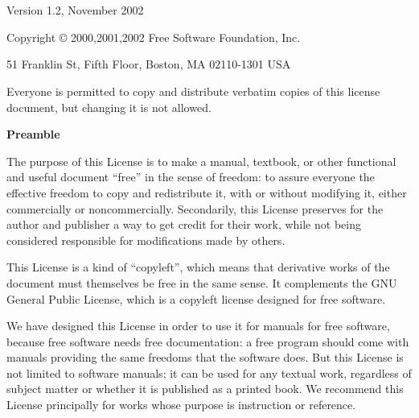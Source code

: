 %
%
%
%
%           
%
\chapter*{}

\begin{center}
Version 1.2, November 2002

 Copyright \copyright{} 2000,2001,2002  Free Software Foundation, Inc.
 
 \bigskip
 
     51 Franklin St, Fifth Floor, Boston, MA  02110-1301  USA
  
 \bigskip
 
 Everyone is permitted to copy and distribute verbatim copies
 of this license document, but changing it is not allowed.
\end{center}


\begin{center}
{\bf\large Preamble}
\end{center}

The purpose of this License is to make a manual, textbook, or other
functional and useful document ``free'' in the sense of freedom: to
assure everyone the effective freedom to copy and redistribute it,
with or without modifying it, either commercially or noncommercially.
Secondarily, this License preserves for the author and publisher a way
to get credit for their work, while not being considered responsible
for modifications made by others.

This License is a kind of ``copyleft'', which means that derivative
works of the document must themselves be free in the same sense.  It
complements the GNU General Public License, which is a copyleft
license designed for free software.

We have designed this License in order to use it for manuals for free
software, because free software needs free documentation: a free
program should come with manuals providing the same freedoms that the
software does.  But this License is not limited to software manuals;
it can be used for any textual work, regardless of subject matter or
whether it is published as a printed book.  We recommend this License
principally for works whose purpose is instruction or reference.


